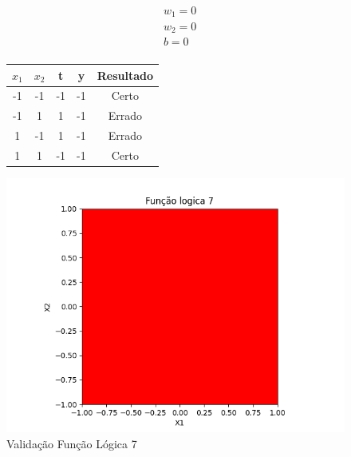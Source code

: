 \begin{figure}[h!]
\centering
\begin{minipage}[c]{0.49\linewidth}
\centering
\[
\begin{aligned}
&w_1 = 0\\
&w_2 = 0\\
&b = 0\\
\end{aligned}
\]
\begin{tabular}{|c|c|c|c|c|}\hline
$x_1$ & $x_2$ & t & y & Resultado\\ \hline
 -1 & -1 & -1 & -1 & Certo\\ \hline
 -1 & 1 & 1 & -1 & Errado\\ \hline
 1 & -1 & 1 & -1 & Errado\\ \hline
 1 & 1 & -1 & -1 & Certo\\ \hline
\end{tabular}
\end{minipage}
\hfill
\begin{minipage}[c]{0.5\linewidth}
\centering
\singlespacing
\includegraphics[width=1.2\textwidth]{im/im7}
\end{minipage}
\caption{Validação Função Lógica 7}
\label{vl7}
\end{figure}

